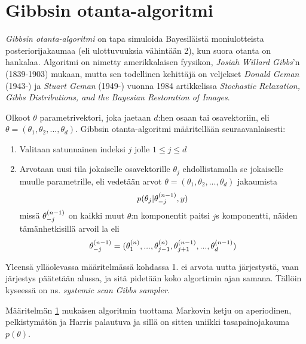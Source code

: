 \section{Gibbsin otanta-algoritmi}\label{gibbs}

\textit{Gibbsin otanta-algoritmi} on tapa simuloida Bayesiläistä moniulotteista posteriorijakaumaa (eli ulottuvuuksia vähintään 2), kun suora otanta on hankalaa. Algoritmi on nimetty amerikkalaisen fyysikon, \textit{Josiah Willard Gibbs}'n (1839-1903) mukaan, mutta sen todellinen kehittäjä on veljekset \textit{Donald Geman} (1943-) ja \textit{Stuart Geman} (1949-) vuonna 1984 artikkelissa \textit{Stochastic Relaxation, Gibbs Distributions, and the Bayesian Restoration of Images}.


\begin{maar}\label{gibbs}
	Olkoot $\theta$ parametrivektori, joka jaetaan $d$:hen osaan tai osavektoriin, eli $\theta = (\theta_1, \theta_2,...,\theta_d)$. Gibbsin otanta-algoritmi määritellään seuraavanlaisesti:
	\begin{enumerate}
		\item Valitaan satunnainen indeksi $j$ jolle $1 \leq j \leq d$
		\item Arvotaan uusi tila jokaiselle osavektorille $\theta_j$ ehdollistamalla se jokaiselle muulle parametrille, eli vedetään arvot $\theta = (\theta_1, \theta_2,...,\theta_d)$ jakaumista
		\begin{equation}
			p(\theta_j|\theta^{(n-1)}_{-j},y)
		\end{equation}
		missä $\theta^{(n-1)}_{-j}$ on kaikki muut $\theta$:n komponentit paitsi $j$s komponentti, näiden tämänhetkisillä arvoil
		la eli 
		\begin{equation*}
			\theta^{(n-1)}_{-j} = (\theta^{(n)}_{1},...,\theta^{(n)}_{j-1},\theta^{(n-1)}_{j+1},...,\theta^{(n-1)}_{d})
		\end{equation*}
	\end{enumerate}
\end{maar}

Yleensä ylläolevassa määritelmässä kohdassa 1. ei arvota uutta järjestystä, vaan järjestys päätetään alussa, ja sitä pidetään koko algortimin ajan samana. Tällöin kyseessä on ns. \textit{systemic scan Gibbs sampler}.

\begin{lause}\label{gibbs-proof}
	Määritelmän \ref{gibbs} mukaisen algoritmin tuottama Markovin ketju on aperiodinen, pelkistymätön ja Harris palautuva ja sillä on sitten uniikki tasapainojakauma $p(\theta)$. \cite{koistinen_computational_2009}
\end{lause}

